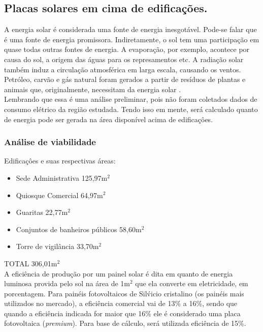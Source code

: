 \subsection{Placas solares em cima de edifica\c{c}\~oes.}

 A energia solar \'e considerada uma fonte de energia inesgot\'avel. Pode-se falar que \'e uma fonte de energia promissora. Indiretamente, o sol tem uma participa\c{c}\~ao em quase todas outras fontes de energia. A evapora\c{c}\~ao, por exemplo, acontece por causa do sol, a origem das \'aguas para os represamentos etc. A radia\c{c}\~ao solar tamb\'em induz a circula\c{c}\~ao atmosf\'erica em larga escala, causando os ventos. Petr\'oleo, carv\~ao e g\'as natural foram gerados a partir de res\'iduos de plantas e animais que, originalmente, necessitam da energia solar \cite{CRESESB}. \\ 
 
 Lembrando que essa \'e uma an\'alise preliminar, pois n\~ao foram coletados dados de consumo el\'etrico da regi\~ao estudada. Tendo isso em mente, ser\'a calculado quanto de energia pode ser gerada na \'area dispon\'ivel acima de edifica\c{c}\^oes. 
 
 \subsubsection{An\'alise de viabilidade}
 
 Edifica\c{c}\^oes e suas respectivas \'areas:
 
 \begin{itemize}
        \item Sede Administrativa			125,97m$^{2}$
	\item Quiosque Comercial			64,97m$^{2}$
	\item Guaritas				22,77m$^{2}$
	\item Conjuntos de banheiros p\'ublicos	58,60m$^{2}$
	\item Torre de vigil\^ancia			33,70m$^{2}$
\end{itemize}

TOTAL					306,01m$^{2}$\\

A efici\^encia de produ\c{c}\~ao por um painel solar \'e dita em quanto de energia luminosa provida pelo sol na \'area de 1m$^{2}$ que ela converte em eletricidade, em porcentagem. Para pain\'eis fotovoltaicos de Sil\'vicio cristalino (os pain\'eis mais utilizados no mercado), a efici\^encia comercial vai de 13\% a 16\%, sendo que quando a efici\^encia indicada for maior que 16\% ele \'e considerado uma placa fotovoltaica (\textit{premium}). Para base de c\'alculo, ser\'a utilizada efici\^encia de 15\%. \\

